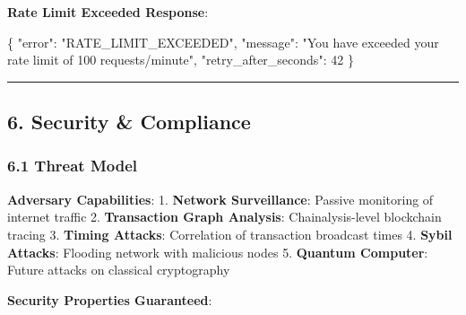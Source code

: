 \documentclass[
  11pt,
]{article}
\newenvironment{Shaded}{\begin{snugshade}}{\end{snugshade}}
\newcommand{\DataTypeTok}[1]{\textcolor[rgb]{0.13,0.29,0.53}{#1}}
\newcommand{\DecValTok}[1]{\textcolor[rgb]{0.00,0.00,0.81}{#1}}
\newcommand{\FunctionTok}[1]{\textcolor[rgb]{0.00,0.00,0.00}{#1}}
\newcommand{\StringTok}[1]{\textcolor[rgb]{0.31,0.60,0.02}{#1}}
\begin{document}
\textbf{Rate Limit Exceeded Response}:

\begin{Shaded}
\begin{Highlighting}[]
\FunctionTok{\{}
  \DataTypeTok{"error"}\FunctionTok{:} \StringTok{"RATE\_LIMIT\_EXCEEDED"}\FunctionTok{,}
  \DataTypeTok{"message"}\FunctionTok{:} \StringTok{"You have exceeded your rate limit of 100 requests/minute"}\FunctionTok{,}
  \DataTypeTok{"retry\_after\_seconds"}\FunctionTok{:} \DecValTok{42}
\FunctionTok{\}}
\end{Highlighting}
\end{Shaded}

\begin{center}\rule{0.5\linewidth}{0.5pt}\end{center}

\hypertarget{security-compliance}{%
\subsection{6. Security \& Compliance}\label{security-compliance}}

\hypertarget{threat-model}{%
\subsubsection{6.1 Threat Model}\label{threat-model}}

\textbf{Adversary Capabilities}: 1. \textbf{Network Surveillance}:
Passive monitoring of internet traffic 2. \textbf{Transaction Graph
Analysis}: Chainalysis-level blockchain tracing 3. \textbf{Timing
Attacks}: Correlation of transaction broadcast times 4. \textbf{Sybil
Attacks}: Flooding network with malicious nodes 5. \textbf{Quantum
Computer}: Future attacks on classical cryptography

\textbf{Security Properties Guaranteed}:
\end{document}
